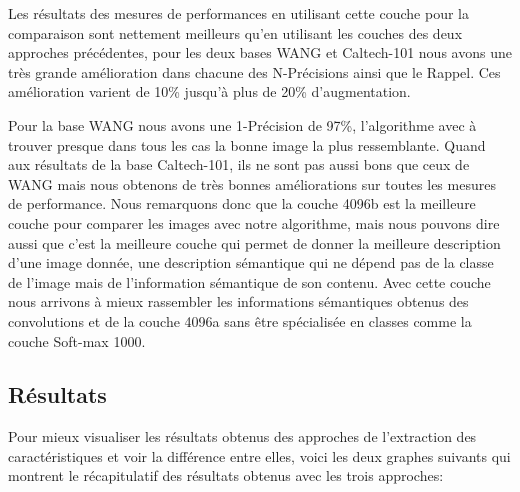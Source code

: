 	Les résultats des mesures de performances en utilisant cette couche pour la comparaison sont nettement meilleurs qu'en utilisant les couches des deux approches précédentes, pour les deux bases WANG et Caltech-101 nous avons une très grande amélioration dans chacune des N-Précisions ainsi que le Rappel. Ces amélioration varient de 10\% jusqu'à plus de 20\% d'augmentation.
	
	Pour la base WANG nous avons une 1-Précision de 97\%, l'algorithme avec à trouver presque dans tous les cas la bonne image la plus ressemblante. Quand aux résultats de la base Caltech-101, ils ne sont pas aussi bons que ceux de WANG mais nous obtenons de très bonnes améliorations sur toutes les mesures de performance. 
	Nous remarquons donc que la couche 4096b est la meilleure couche pour comparer les images avec notre algorithme, mais nous pouvons dire aussi que c'est la meilleure couche qui permet de donner la meilleure description d'une image donnée, une description sémantique qui ne dépend pas de la classe de l'image mais de l'information sémantique de son contenu. Avec cette couche nous arrivons à mieux rassembler les informations sémantiques obtenus des convolutions et de la couche 4096a sans être spécialisée en classes comme la couche Soft-max 1000.
	
\subsection{Résultats}

	Pour mieux visualiser les résultats obtenus des approches de l'extraction des caractéristiques et voir la différence entre elles, voici les deux graphes suivants qui montrent le récapitulatif des résultats obtenus avec les trois approches:

